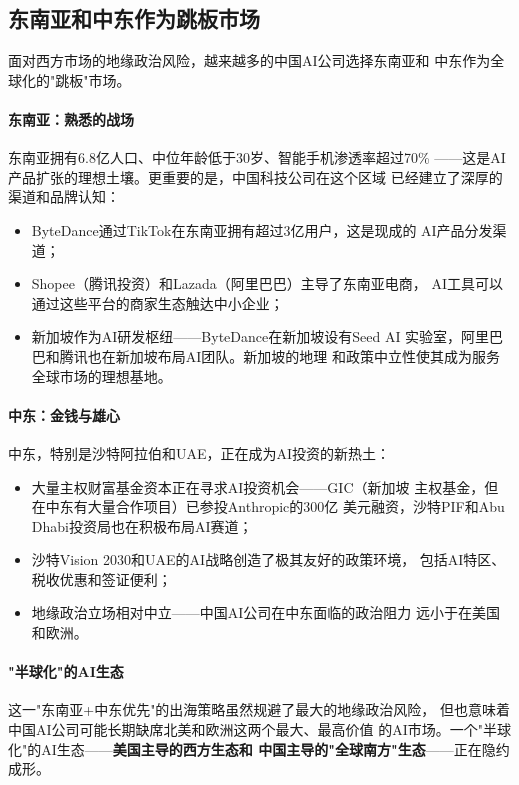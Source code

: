\subsection{东南亚和中东作为跳板市场}
\label{subsec:outlook-sea-mena-springboard}

面对西方市场的地缘政治风险，越来越多的中国AI公司选择东南亚和
中东作为全球化的"跳板"市场。

\paragraph{东南亚：熟悉的战场}
东南亚拥有6.8亿人口、中位年龄低于30岁、智能手机渗透率超过70\%
——这是AI产品扩张的理想土壤。更重要的是，中国科技公司在这个区域
已经建立了深厚的渠道和品牌认知：
\begin{itemize}
  \item ByteDance通过TikTok在东南亚拥有超过3亿用户，这是现成的
    AI产品分发渠道；
  \item Shopee（腾讯投资）和Lazada（阿里巴巴）主导了东南亚电商，
    AI工具可以通过这些平台的商家生态触达中小企业；
  \item 新加坡作为AI研发枢纽——ByteDance在新加坡设有Seed AI
    实验室，阿里巴巴和腾讯也在新加坡布局AI团队。新加坡的地理
    和政策中立性使其成为服务全球市场的理想基地。
\end{itemize}

\paragraph{中东：金钱与雄心}
中东，特别是沙特阿拉伯和UAE，正在成为AI投资的新热土：
\begin{itemize}
  \item 大量主权财富基金资本正在寻求AI投资机会——GIC（新加坡
    主权基金，但在中东有大量合作项目）已参投Anthropic的300亿
    美元融资，沙特PIF和Abu Dhabi投资局也在积极布局AI赛道；
  \item 沙特Vision 2030和UAE的AI战略创造了极其友好的政策环境，
    包括AI特区、税收优惠和签证便利；
  \item 地缘政治立场相对中立——中国AI公司在中东面临的政治阻力
    远小于在美国和欧洲。
\end{itemize}

\paragraph{"半球化"的AI生态}
这一"东南亚+中东优先"的出海策略虽然规避了最大的地缘政治风险，
但也意味着中国AI公司可能长期缺席北美和欧洲这两个最大、最高价值
的AI市场。一个"半球化"的AI生态——\textbf{美国主导的西方生态和
中国主导的"全球南方"生态}——正在隐约成形。


